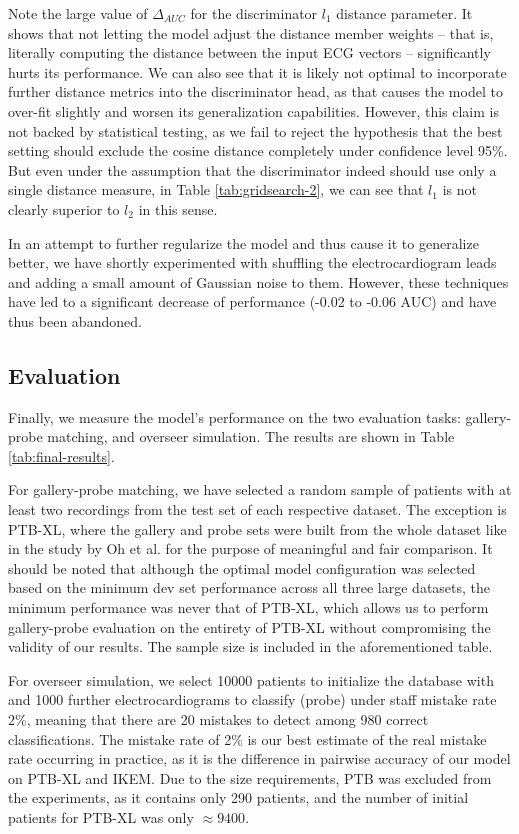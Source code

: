\documentclass[preprint,12pt]{elsarticle}
\begin{document}
Note the large value of $\Delta_{AUC}$ for the discriminator $l_1$ distance parameter. It shows that not letting the model adjust the distance member weights -- that is, literally computing the distance between the input ECG vectors -- significantly hurts its performance. We can also see that it is likely not optimal to incorporate further distance metrics into the discriminator head, as that causes the model to over-fit slightly and worsen its generalization capabilities. However, this claim is not backed by statistical testing, as we fail to reject the hypothesis that the best setting should exclude the cosine distance completely under confidence level 95\%. But even under the assumption that the discriminator indeed should use only a single distance measure, in Table \ref{tab:gridsearch-2}, we can see that $l_1$ is not clearly superior to $l_2$ in this sense.

In an attempt to further regularize the model and thus cause it to generalize better, we have shortly experimented with shuffling the electrocardiogram leads and adding a small amount of Gaussian noise to them. However, these techniques have led to a significant decrease of performance (-0.02 to -0.06 AUC) and have thus been abandoned.





\subsection{Evaluation}

Finally, we measure the model's performance on the two evaluation tasks: gallery-probe matching, and overseer simulation. The results are shown in Table \ref{tab:final-results}. 

For gallery-probe matching, we have selected a random sample of patients with at least two recordings from the test set of each respective dataset. The exception is PTB-XL, where the gallery and probe sets were built from the whole dataset like in the study by Oh et al. \cite{oh2022lead} for the purpose of meaningful and fair comparison. It should be noted that although the optimal model configuration was selected based on the minimum dev set performance across all three large datasets, the minimum performance was never that of PTB-XL, which allows us to perform gallery-probe evaluation on the entirety of PTB-XL without compromising the validity of our results. The sample size is included in the aforementioned table. 

For overseer simulation, we select 10000 patients to initialize the database with and 1000 further electrocardiograms to classify (probe) under staff mistake rate $2\%$, meaning that there are 20 mistakes to detect among 980 correct classifications. The mistake rate of 2\% is our best estimate of the real mistake rate occurring in practice, as it is the difference in pairwise accuracy of our model on PTB-XL and IKEM. Due to the size requirements, PTB was excluded from the experiments, as it contains only 290 patients, and the number of initial patients for PTB-XL was only $\approx 9400$. 
\end{document}
